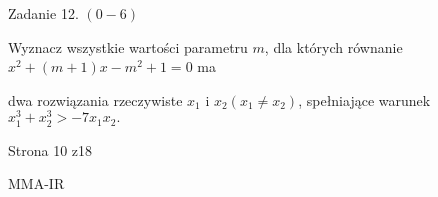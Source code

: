 \documentclass[a4paper,12pt]{article}
\begin{document}
Zadanie 12. $(0-6)$

Wyznacz wszystkie wartości parametru $m$, dla których równanie $x^{2}+(m+1)x-m^{2}+1=0$ ma

dwa rozwiązania rzeczywiste $x_{1}$ i $x_{2}(x_{1}\neq x_{2})$, spełniające warunek $x_{1}^{3}+x_{2}^{3}>-7x_{1}x_{2}.$

Strona 10 z18

MMA-IR
\end{document}
